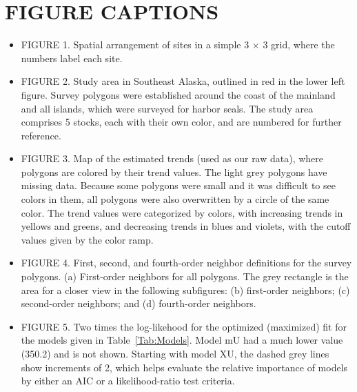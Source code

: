 \documentclass[11pt, titlepage]{article}\usepackage[]{graphicx}\usepackage[]{color}
\begin{document}
\begin{spacing}{1.9}
\begin{flushleft}
\begin{table}[ht]
\begin{center}
\begin{tabular}{c|rr|rr|rr|rr}
\end{tabular}
\end{center}
\end{table}



\clearpage

\section*{FIGURE CAPTIONS}

\begin{itemize}
  \item FIGURE 1. Spatial arrangement of sites in a simple 3 $\times$ 3 grid, where the numbers label each site.

  \item FIGURE 2. Study area in Southeast Alaska, outlined in red in the lower left figure.  Survey polygons were established around the coast of the mainland and all islands, which were surveyed for harbor seals.  The study area comprises 5 stocks, each with their own color, and are numbered for further reference.

  \item  FIGURE 3. Map of the estimated trends (used as our raw data), where polygons are colored by their trend values.  The light grey polygons have missing data.  Because some polygons were small and it was difficult to see colors in them, all polygons were also overwritten by a circle of the same color. The trend values were categorized by colors, with increasing trends in yellows and greens, and decreasing trends in blues and violets, with the cutoff values given by the color ramp.

  \item FIGURE 4. First, second, and fourth-order neighbor definitions for the survey polygons. (a) First-order neighbors for all polygons.  The grey rectangle is the area for a closer view in the following subfigures: (b) first-order neighbors; (c) second-order neighbors; and (d) fourth-order neighbors.

  \item FIGURE 5. Two times the log-likehood for the optimized (maximized) fit for the models given in Table~\ref{Tab:Models}. Model mU had a much lower value (350.2) and is not shown. Starting with model XU, the dashed grey lines show increments of 2, which helps evaluate the relative importance of models by either an AIC or a likelihood-ratio test criteria.


\end{itemize}
\end{flushleft}
\end{spacing}
\end{document}
